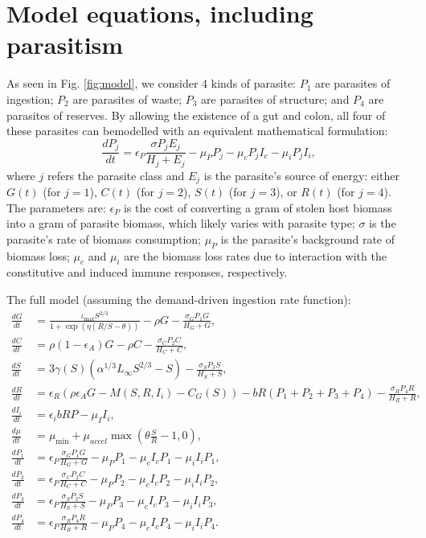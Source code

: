 \documentclass[11pt,reqno,final,pdftex]{amsart}\usepackage[]{graphicx}\usepackage[]{color}
\theoremstyle{plain}
\numberwithin{equation}{part}
\begin{document}
\section*{Model equations, including parasitism}
As seen in Fig. \ref{fig:model}, we consider 4 kinds of parasite: $P_1$ are parasites of ingestion; $P_2$ are parasites of waste; $P_3$ are parasites of structure; and $P_4$ are parasites of reserves.
By allowing the existence of a gut and colon, all four of these parasites can bemodelled with an equivalent mathematical formulation:
\begin{equation}
\frac{dP_j}{dt} = \epsilon_P \frac{\sigma P_j E_j}{H_j+E_j}  - \mu_P P_j - \mu_c P_j I_c - \mu_i P_j I_i,
\end{equation}
where $j$ refers the parasite class and $E_j$ is the parasite's source of energy: either $G(t)$ (for $j=1$), $C(t)$ (for $j=2$), $S(t)$ (for $j=3$), or $R(t)$ (for $j=4$).
The parameters are: $\epsilon_P$ is the cost of converting a gram of stolen host biomass into a gram of parasite biomass, which likely varies with parasite type; $\sigma$ is the parasite's rate of biomass consumption; $\mu_P$ is the parasite's background rate of biomass loss; $\mu_c$ and $\mu_i$ are the biomass loss rates due to interaction with the constitutive and induced immune responses, respectively.

The full model (assuming the demand-driven ingestion rate function):
\begin{align}
\frac{dG}{dt} &= \frac{\iota_{\max}S^{2/3}}{1 + \exp\left(\eta(R/S-\theta)\right)} - \rho G - \frac{\sigma_G P_1 G}{H_G + G}, \\
\frac{dC}{dt} &= \rho (1-\epsilon_A)G - \rho C - \frac{\sigma_C P_2 C}{H_C + C}, \\
\frac{dS}{dt} &= 3\gamma(S) \left(\alpha^{1/3}L_{\infty }S^{2/3}-S\right) - \frac{\sigma_S P_3 S}{H_S + S}, \\
\frac{dR}{dt} &= \epsilon_R\left(\rho \epsilon_A G-M(S,R,I_i)-C_G(S)\right)-b R (P_1+P_2+P_3+P_4) - \frac{\sigma_R P_4 R}{H_R + R}, \\
\frac{dI_i}{dt} &= \epsilon_ib R P-\mu_II_i, \\
\frac{d\mu}{dt} &= \mu_{\min} + \mu_{accel}\max\left(\theta \frac{S}{R} - 1, 0\right), \\
\frac{dP_1}{dt} &= \epsilon_P \frac{\sigma_G P_1 G}{H_G + G} - \mu_P P_1 - \mu_c I_c P_1 - \mu_i I_i P_1, \\
\frac{dP_2}{dt} &= \epsilon_P \frac{\sigma_C P_2 C}{H_C + C} - \mu_P P_2 - \mu_c I_c P_2 - \mu_i I_i P_2, \\
\frac{dP_3}{dt} &= \epsilon_P \frac{\sigma_S P_3 S}{H_S + S} - \mu_P P_3 - \mu_c I_c P_3 - \mu_i I_i P_3, \\
\frac{dP_4}{dt} &= \epsilon_P \frac{\sigma_R P_4 R}{H_R + R} - \mu_P P_4 - \mu_c I_c P_4 - \mu_i I_i P_4.
\end{align}
\end{document}
